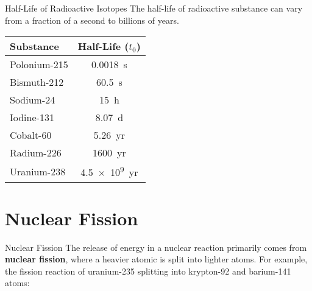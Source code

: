 \documentclass[12pt,compress,aspectratio=169]{beamer}
\begin{document}
\begin{frame}{Half-Life of Radioactive Isotopes}
  The half-life of radioactive substance can vary from a fraction of
  a second to billions of years.
  \begin{center}
    \begin{tabular}{l|c}
      \rowcolor{pink}
      \textbf{Substance} & \textbf{Half-Life} ($t_0$) \\ \hline
      Polonium-215 & \SI{.0018}{\second} \\
      Bismuth-212  & \SI{60.5}{\second} \\
      Sodium-24    & \SI{15}{\hour} \\
      Iodine-131   & \SI{8.07}{\day} \\
      Cobalt-60    & \SI{5.26}{yr} \\ 
      Radium-226   & \SI{1600}{yr} \\
      Uranium-238  & \SI{4.5e9}{yr}
    \end{tabular}
  \end{center}
\end{frame}



\section{Nuclear Fission}

\begin{frame}{Nuclear Fission}
  The release of energy in a nuclear reaction primarily comes from
  \textbf{nuclear fission}, where a heavier atomic is split into lighter atoms.
  For example, the fission reaction of uranium-235 splitting into krypton-92
  and barium-141 atoms:
  \begin{center}
  \end{center}

\end{frame}
\end{document}
